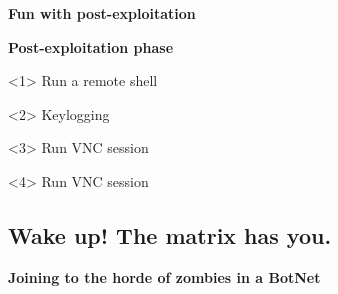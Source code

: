 \begin{frame}[plain]
    \begin{center}
      \Huge\bfseries
      Fun with post-exploitation
    \end{center}
\end{frame}

\begin{frame}[plain]
  \begin{center}
    \LARGE\bfseries
    Post-exploitation phase
  \end{center}

  \vspace{.5cm}

  \begin{onlyenv}<1>
    Run a remote shell
    \begin{center}
    \end{center}
  \end{onlyenv}

  \begin{onlyenv}<2>
    Keylogging
    \begin{center}
    \end{center}
  \end{onlyenv}


  \begin{onlyenv}<3>
    Run VNC session
    \begin{center}
    \end{center}
  \end{onlyenv}

  \begin{onlyenv}<4>
    Run VNC session
    \begin{center}
    \end{center}
  \end{onlyenv}

\end{frame}

\subsection{Wake up! The matrix has you.}

\begin{frame}[plain]
    \begin{center}
      \Huge\bfseries
      Joining to the horde of zombies in a BotNet
    \end{center}
\end{frame}
